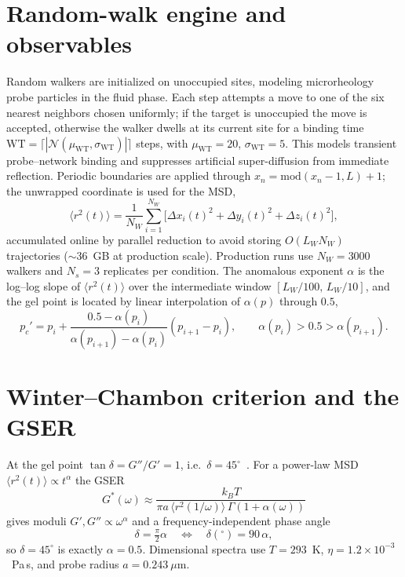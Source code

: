 \documentclass[aps,prl,onecolumn,superscriptaddress,nofootinbib]{revtex4-2}
\newcommand{\msd}{\langle r^2(t)\rangle}
\newcommand{\pcp}{p_c'}
\begin{document}
\section{Random-walk engine and observables}
Random walkers are initialized on unoccupied sites, modeling microrheology probe particles in
the fluid phase. Each step attempts a move to one of the six nearest neighbors chosen uniformly;
if the target is unoccupied the move is accepted, otherwise the walker dwells at its current site
for a binding time $\mathrm{WT}=\lceil|\mathcal{N}(\mu_{\mathrm{WT}},\sigma_{\mathrm{WT}})|\rceil$
steps, with $\mu_{\mathrm{WT}}=20$, $\sigma_{\mathrm{WT}}=5$. This models transient probe--network
binding and suppresses artificial super-diffusion from immediate reflection. Periodic boundaries
are applied through $x_n=\mathrm{mod}(x_n-1,L)+1$; the unwrapped coordinate is used for the MSD,
\begin{equation}
  \msd=\frac{1}{N_W}\sum_{i=1}^{N_W}\big[\Delta x_i(t)^2+\Delta y_i(t)^2+\Delta z_i(t)^2\big],
\end{equation}
accumulated online by parallel reduction to avoid storing $O(L_W N_W)$ trajectories
($\sim$36~GB at production scale). Production runs use $N_W=3000$ walkers and $N_s=3$ replicates
per condition. The anomalous exponent $\alpha$ is the log--log slope of $\msd$ over the
intermediate window $[L_W/100,\,L_W/10]$, and the gel point is located by linear interpolation of
$\alpha(p)$ through $0.5$,
\begin{equation}
  \pcp=p_i+\frac{0.5-\alpha(p_i)}{\alpha(p_{i+1})-\alpha(p_i)}(p_{i+1}-p_i),
  \qquad \alpha(p_i)>0.5>\alpha(p_{i+1}).
\end{equation}

\section{Winter--Chambon criterion and the GSER}
At the gel point $\tan\delta=G''/G'=1$, i.e.\ $\delta=45^{\circ}$~\cite{Winter1987,Chambon1987}.
For a power-law MSD $\msd\propto t^{\alpha}$ the GSER~\cite{Mason1995,Mason2000}
\begin{equation}
  G^*(\omega)\approx\frac{k_BT}{\pi a\,\langle r^2(1/\omega)\rangle\,\Gamma(1+\alpha(\omega))}
\end{equation}
gives moduli $G',G''\propto\omega^{\alpha}$ and a frequency-independent phase angle
\begin{equation}
  \delta=\tfrac{\pi}{2}\alpha \quad\Longleftrightarrow\quad \delta(^{\circ})=90\,\alpha,
\end{equation}
so $\delta=45^{\circ}$ is exactly $\alpha=0.5$. Dimensional spectra use $T=293$~K,
$\eta=1.2\times10^{-3}$~Pa\,s, and probe radius $a=0.243~\mu$m.
\end{document}
